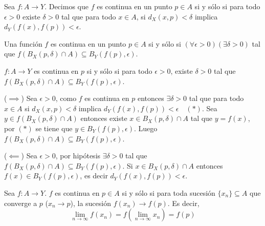 \begin{definicion} %
Sea $f: A \to Y$. Decimos que $f$ es continua en un punto $p \in A$ si y sólo si para todo $\epsilon > 0$ existe $\delta > 0$ tal que para todo $x \in A$, si $d_X(x, p) < \delta$ implica $d_Y(f(x), f(p)) < \epsilon$. %
\end{definicion}

\begin{definicion} %
Una función $f$ es continua en un punto $p \in A$ si y sólo si $(\forall \epsilon > 0)(\exists \delta > 0)$ tal que $f(B_X(p, \delta) \cap A) \subseteq B_Y(f(p), \epsilon)$. %
\end{definicion}

\begin{remark} %
$f: A \to Y$ es continua en $p$ si y sólo si para todo $\epsilon > 0$, existe $\delta > 0$ tal que $f(B_X(p, \delta) \cap A) \subseteq B_Y(f(p), \epsilon)$. %
\end{remark}

\begin{dem} %
($\implies$) Sea $\epsilon > 0$, como $f$ es continua en $p$ entonces $\exists \delta > 0$ tal que para todo $x \in A$ si $d_X(x, p) < \delta$ implica $d_Y(f(x), f(p)) < \epsilon \quad (*)$. %
Sea $y \in f(B_X(p, \delta) \cap A)$ entonces existe $x \in B_X(p, \delta) \cap A$ tal que $y = f(x)$, por $(*)$ se tiene que $y \in B_Y(f(p), \epsilon)$. %
Luego $f(B_X(p, \delta) \cap A) \subseteq B_Y(f(p), \epsilon)$. %

($\impliedby$) Sea $\epsilon > 0$, por hipótesis $\exists \delta > 0$ tal que $f(B_X(p, \delta) \cap A) \subseteq B_Y(f(p), \epsilon)$. %
Si $x \in B_X(p, \delta) \cap A$ entonces $f(x) \in B_Y(f(p), \epsilon)$, es decir $d_Y(f(x), f(p)) < \epsilon$. %
\end{dem}

\begin{teorema} %
Sea $f: A \to Y$. $f$ es continua en $p \in A$ si y sólo si para toda sucesión $\{x_n\} \subseteq A$ que converge a $p$ ($x_n \to p$), la sucesión $f(x_n) \to f(p)$. %
Es decir,
$$ \lim_{n \to \infty} f(x_n) = f\left(\lim_{n \to \infty} x_n\right) = f(p) $$ %
\end{teorema}

